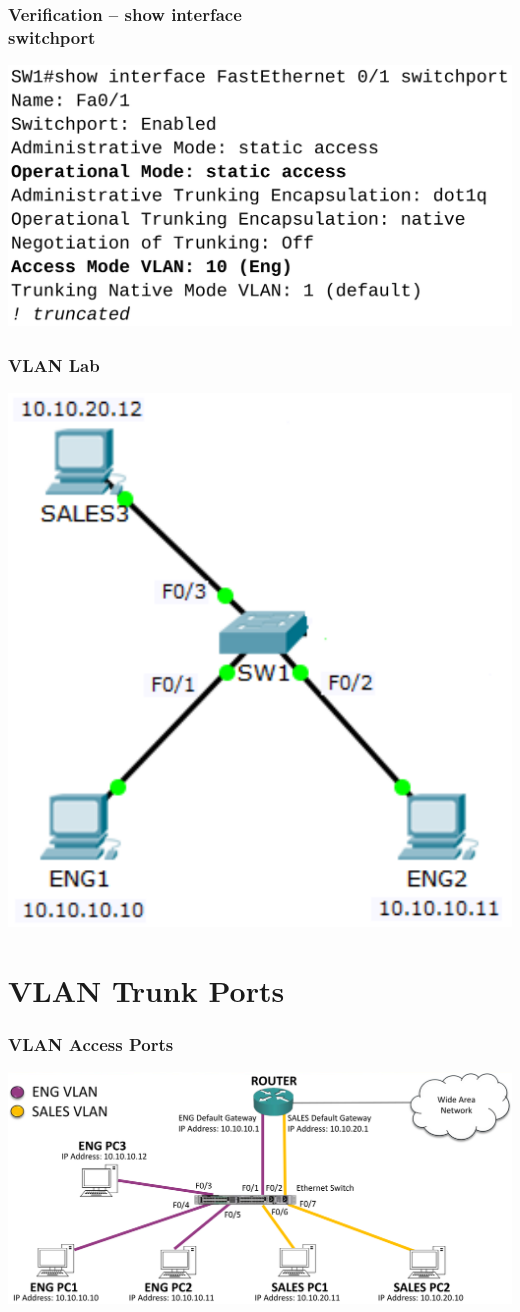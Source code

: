 \documentclass[pdflatex,compress,mathserif]{beamer}
\begin{document}
\begin{frame}
	\frametitle{Verification – show interface\\ switchport}
	\begin{center}
		\includegraphics[width=0.8\linewidth]{img/img39}
	\end{center}
\end{frame}

\begin{frame}
	\frametitle{VLAN Lab}
	\begin{center}
		\includegraphics[width=0.5\linewidth]{img/img40}
	\end{center}
\end{frame}

\section{VLAN Trunk Ports}

\begin{frame}
	\frametitle{VLAN Access Ports}
	\begin{center}
		\includegraphics[width=\linewidth]{img/img18}
	\end{center}
\end{frame}
\end{document}
